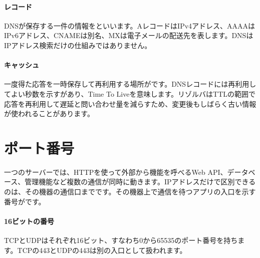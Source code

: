 \par
\endgroup
\medskip
\begingroup
\paragraph{レコード}
        DNSが保存する一件の情報をといいます。AレコードはIPv4アドレス、AAAAはIPv6アドレス、CNAMEは別名、MXは電子メールの配送先を表します。DNSはIPアドレス検索だけの仕組みではありません。

\par
\endgroup
\medskip
\begingroup
\paragraph{キャッシュ}
        一度得た応答を一時保存して再利用する場所がです。DNSレコードには再利用してよい秒数を示すがあり、Time To Liveを意味します。リゾルバはTTLの範囲で応答を再利用して遅延と問い合わせ量を減らすため、変更後もしばらく古い情報が使われることがあります。

\par
\endgroup
\par
\endgroup


\section{ポート番号}
\label{sec:05-network-09}

一つのサーバーでは、HTTPを使って外部から機能を呼べるWeb API、データベース、管理機能など複数の通信が同時に動きます。IPアドレスだけで区別できるのは、その機器の通信口までです。その機器上で通信を待つアプリの入口を示す番号がです。

\begingroup
\begingroup
      \centering
\par
\endgroup
\medskip
\begingroup
\paragraph{16ビットの番号}
        TCPとUDPはそれぞれ16ビット、すなわち0から65535のポート番号を持ちます。TCPの443とUDPの443は別の入口として扱われます。

